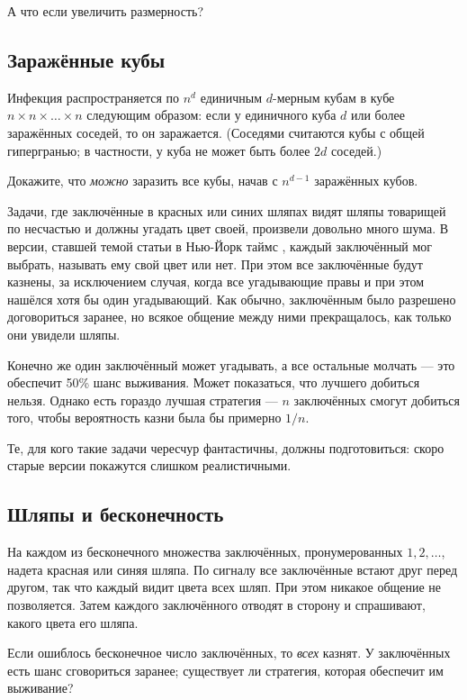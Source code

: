 А что если увеличить размерность?

\subsection*{Заражённые кубы}

Инфекция распространяется по $n^d$ единичным $d$-мерным кубам в кубе $n \times n \times \dots \times n$ следующим образом: если у единичного куба $d$ или более заражённых соседей, то он заражается.
(Соседями считаются кубы с общей гипергранью; в частности, у куба не может быть более $2d$ соседей.)

Докажите, что \emph{можно} заразить все кубы, начав с $n^{d-1}$ заражённых кубов.

\medskip

Задачи, где заключённые в красных или синих шляпах видят шляпы товарищей по несчастью и должны угадать цвет своей, произвели довольно много шума.
В версии, ставшей темой статьи в Нью-Йорк таймс \cite{50}, каждый заключённый мог выбрать, называть ему свой цвет или нет.
При этом все заключённые будут казнены, за исключением случая, когда все угадывающие правы и при этом нашёлся хотя бы один угадывающий.
Как обычно, заключённым было разрешено договориться заранее, но всякое общение между ними прекращалось, как только они увидели шляпы.

Конечно же один заключённый может угадывать, а все остальные молчать --- 
это обеспечит 50\% шанс выживания. 
Может показаться, что лучшего добиться нельзя.
Однако есть гораздо лучшая стратегия --- $n$ заключённых смогут добиться того, чтобы вероятность казни была бы примерно $1/n$.

Те, для кого такие задачи чересчур фантастичны, должны подготовиться: скоро старые версии покажутся слишком реалистичными.

\subsection*{Шляпы и бесконечность}\label{Шляпы и бесконечность}

На каждом из бесконечного множества заключённых, пронумерованных $1,2,\dots$, надета красная или синяя шляпа.
По сигналу все заключённые встают друг перед другом, так что каждый видит цвета всех шляп.
При этом никакое общение не позволяется.
Затем каждого заключённого отводят в сторону и спрашивают, какого цвета его шляпа.

Если ошиблось бесконечное число заключённых, то \emph{всех} казнят. 
У заключённых есть шанс сговориться заранее;
существует ли стратегия, которая обеспечит им выживание?

